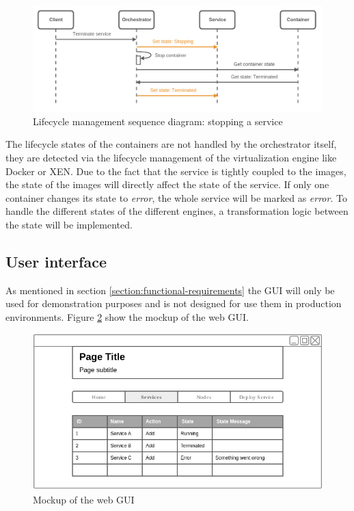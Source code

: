 \begin{figure}[H]
    \centering
    \includegraphics[width=\textwidth]{resources/images/lifecycle_sequence_diagram_stop_service.png}
    \caption[Lifecycle management sequence diagram: stopping a service]{Lifecycle management sequence diagram: stopping a service}
    \label{fig:lifecycle_mgm_squence_diagram_stop_service}
\end{figure}

The lifecycle states of the containers are not handled by the orchestrator itself, they are detected via the lifecycle management of the virtualization engine like Docker or XEN.
Due to the fact that the service is tightly coupled to the images, the state of the images will directly affect the state of the service.
If only one container changes its state to \textit{error}, the whole service will be marked as \textit{error}.
To handle the different states of the different engines, a transformation logic between the state will be implemented.


\subsection{User interface}
As mentioned in section \ref{section:functional-requirements} the \ac{GUI} will only be used for demonstration purposes and is not designed for use them in production environments.
Figure \ref{fig:gui_mockup} show the mockup of the web \ac{GUI}.

\begin{figure}[H]
    \centering
    \includegraphics[width=\textwidth]{resources/images/gui_prototype.png}
    \caption[Mockup of the web GUI]{Mockup of the web GUI}
    \label{fig:gui_mockup}
\end{figure}

